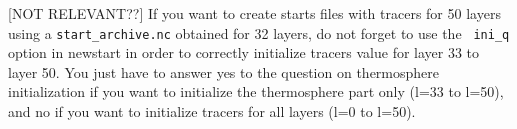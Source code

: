 [NOT RELEVANT??]
If you want to create starts files with tracers for 50 layers using a
{\tt start\_archive.nc} obtained for 32 layers, do not forget to use the
\verb+ ini_q+ option in newstart in order to correctly initialize tracers
value for layer 33 to layer 50.
You just have to answer yes to the question on thermosphere initialization
if you want to initialize the thermosphere part only (l=33 to l=50),
and no if you want to initialize tracers for all layers (l=0 to l=50).\\ \\

